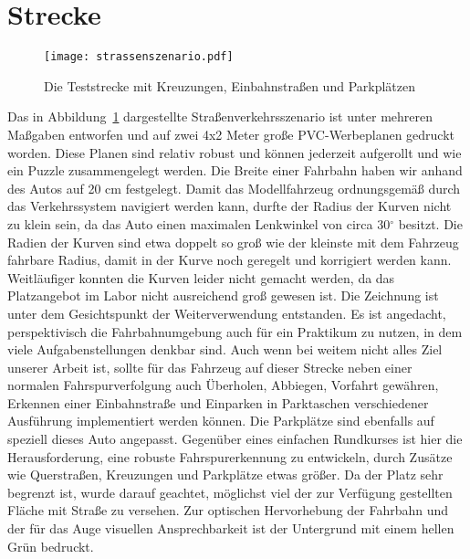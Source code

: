 \section{Strecke}

\begin{figure}[H] %
  \centering
  \texttt{[image: strassenszenario.pdf]}
  \caption{Die Teststrecke mit Kreuzungen, Einbahnstraßen und Parkplätzen}
  \label{fig:strassenszenario}
\end{figure}

Das in Abbildung~\ref{fig:strassenszenario} dargestellte Straßenverkehrsszenario ist unter mehreren Maßgaben entworfen und auf zwei 4x2 Meter große PVC-Werbeplanen gedruckt worden. Diese Planen sind relativ robust und können jederzeit aufgerollt und wie ein Puzzle zusammengelegt werden. Die Breite einer Fahrbahn haben wir anhand des Autos auf 20 cm festgelegt. Damit das Modellfahrzeug ordnungsgemäß durch das Verkehrssystem navigiert werden kann, durfte der Radius der Kurven nicht zu klein sein, da das Auto einen maximalen Lenkwinkel von circa 30\(^\circ\) besitzt. Die Radien der Kurven sind etwa doppelt so groß wie der kleinste mit dem Fahrzeug fahrbare Radius, damit in der Kurve noch geregelt und korrigiert werden kann. Weitläufiger konnten die Kurven leider nicht gemacht werden, da das Platzangebot im Labor nicht ausreichend groß gewesen ist.
Die Zeichnung ist unter dem Gesichtspunkt der Weiterverwendung entstanden. Es ist angedacht, perspektivisch die Fahrbahnumgebung auch für ein Praktikum zu nutzen, in dem viele Aufgabenstellungen denkbar sind. Auch wenn bei weitem nicht alles Ziel unserer Arbeit ist, sollte für das Fahrzeug auf dieser Strecke neben einer normalen Fahrspurverfolgung auch Überholen, Abbiegen, Vorfahrt gewähren, Erkennen einer Einbahnstraße und Einparken in Parktaschen verschiedener Ausführung implementiert werden können. Die Parkplätze sind ebenfalls auf speziell dieses Auto angepasst. Gegenüber eines einfachen Rundkurses ist hier die Herausforderung, eine robuste Fahrspurerkennung zu entwickeln, durch Zusätze wie Querstraßen, Kreuzungen und Parkplätze etwas größer. Da der Platz sehr begrenzt ist, wurde darauf geachtet, möglichst viel der zur Verfügung gestellten Fläche mit Straße zu versehen. Zur optischen Hervorhebung der Fahrbahn und der für das Auge visuellen Ansprechbarkeit ist der Untergrund mit einem hellen Grün bedruckt.
